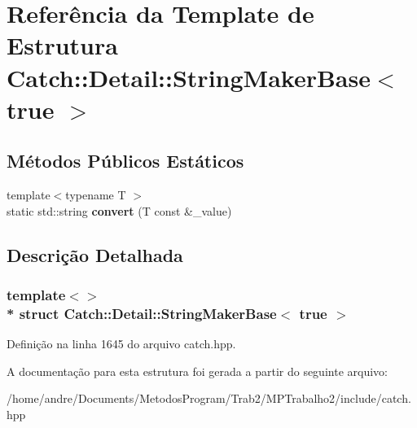 \hypertarget{structCatch_1_1Detail_1_1StringMakerBase_3_01true_01_4}{}\section{Referência da Template de Estrutura Catch\+:\+:Detail\+:\+:String\+Maker\+Base$<$ true $>$}
\label{structCatch_1_1Detail_1_1StringMakerBase_3_01true_01_4}
\subsection*{Métodos Públicos Estáticos}
\begin{DoxyCompactItemize}
\item 
{\footnotesize template$<$typename T $>$ }\\static std\+::string {\bfseries convert} (T const \&\+\_\+value)\hypertarget{structCatch_1_1Detail_1_1StringMakerBase_3_01true_01_4_af9b5fdf7fddd8c5c873caa819e5f00f6}{}\label{structCatch_1_1Detail_1_1StringMakerBase_3_01true_01_4_af9b5fdf7fddd8c5c873caa819e5f00f6}

\end{DoxyCompactItemize}


\subsection{Descrição Detalhada}
\subsubsection*{template$<$$>$\\*
struct Catch\+::\+Detail\+::\+String\+Maker\+Base$<$ true $>$}



Definição na linha 1645 do arquivo catch.\+hpp.



A documentação para esta estrutura foi gerada a partir do seguinte arquivo\+:\begin{DoxyCompactItemize}
\item 
/home/andre/\+Documents/\+Metodos\+Program/\+Trab2/\+M\+P\+Trabalho2/include/catch.\+hpp\end{DoxyCompactItemize}
